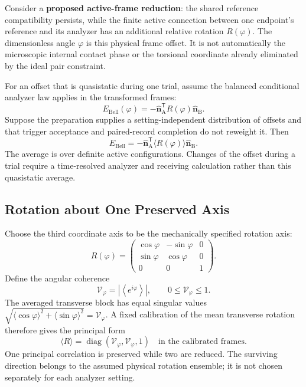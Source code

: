 Consider a \textbf{proposed active-frame reduction}: the shared reference compatibility persists, while the finite active connection between one endpoint's reference and its analyzer has an additional relative rotation $R(\varphi)$. The dimensionless angle $\varphi$ is this physical frame offset. It is not automatically the microscopic internal contact phase or the torsional coordinate already eliminated by the ideal pair constraint.

For an offset that is quasistatic during one trial, assume the balanced conditional analyzer law applies in the transformed frames:
\begin{equation}
    E_{\mathrm{Bell}}(\varphi)
    =-\widehat{\mathbf n}_{\mathrm A}^{\mathsf T}
       R(\varphi)\widehat{\mathbf n}_{\mathrm B}.
\end{equation}
Suppose the preparation supplies a setting-independent distribution of offsets and that trigger acceptance and paired-record completion do not reweight it. Then
\begin{equation}
    \boxed{
    E_{\mathrm{Bell}}
    =-\widehat{\mathbf n}_{\mathrm A}^{\mathsf T}
       \langle R(\varphi)\rangle\widehat{\mathbf n}_{\mathrm B}
    }.
\end{equation}
The average is over definite active configurations. Changes of the offset during a trial require a time-resolved analyzer and receiving calculation rather than this quasistatic average.

\subsection{Rotation about One Preserved Axis}

Choose the third coordinate axis to be the mechanically specified rotation axis:
\begin{equation}
    R(\varphi)=
    \begin{pmatrix}
    \cos\varphi&-\sin\varphi&0\\
    \sin\varphi&\cos\varphi&0\\
    0&0&1
    \end{pmatrix}.
\end{equation}
Define the angular coherence
\begin{equation}
    \boxed{
    \mathcal V_\varphi
    =\left|\left\langle e^{i\varphi}\right\rangle\right|,
    \qquad 0\leq\mathcal V_\varphi\leq1
    }.
\end{equation}
The averaged transverse block has equal singular values $\sqrt{\langle\cos\varphi\rangle^2+\langle\sin\varphi\rangle^2}=\mathcal V_\varphi$. A fixed calibration of the mean transverse rotation therefore gives the principal form
\begin{equation}
    \langle R\rangle
    =\operatorname{diag}(\mathcal V_\varphi,\mathcal V_\varphi,1)
    \quad\text{in the calibrated frames}.
\end{equation}
One principal correlation is preserved while two are reduced. The surviving direction belongs to the assumed physical rotation ensemble; it is not chosen separately for each analyzer setting.

